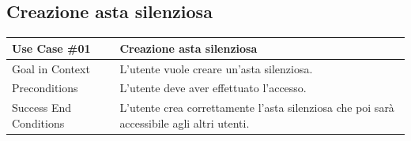 \subsection{Creazione asta silenziosa}
\begin{table}[H]
	\renewcommand{\arraystretch}{1.3}
	\begin{tabularx}{\linewidth}{|p{120pt}|p{40pt}|X|X|}
		\hline \rowcolor[HTML]{DCDCDC}
		\textbf{\large\sffamily Use Case {\ttfamily \#}01} & \multicolumn{3}{p{367pt}|}{\textbf{\large\sffamily Creazione asta silenziosa}}                                                                                                                                                                     \\
		\hline Goal in Context                             & \multicolumn{3}{p{367pt}|}{L'utente vuole creare un'asta silenziosa.}                                                                                                                                                                              \\
		\hline Preconditions                               & \multicolumn{3}{p{367pt}|}{L'utente deve aver effettuato l'accesso.}                                                                                                                                                                               \\
		\hline Success End Conditions                      & \multicolumn{3}{p{367pt}|}{L'utente crea correttamente l'asta silenziosa che poi sarà accessibile agli altri  utenti.}                                                                                                                             \\


\end{tabularx}
\end{table}
